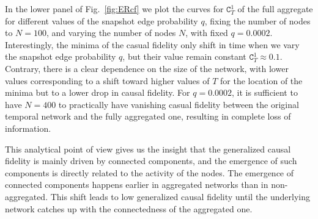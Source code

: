 \documentclass[%
 reprint,
 amsmath,amssymb,
 aps,
]{revtex4-2}
\newcommand{\fla}[1]{\textcolor{red}{flavio says: #1}}
\begin{document}
In the lower panel of Fig.~\ref{fig:ERcf} we plot the curves for $\mathtt{C}^1_T$ of the full aggregate for different values of the snapshot edge probability $q$, fixing the number of nodes to $N= 100$, and varying the number of nodes $N$, with fixed $q= 0.0002$.
Interestingly, the minima of the casual fidelity only shift in time when we vary the snapshot edge probability $q$, but their value remain constant $\mathtt{C}^1_T\approx 0.1$.
Contrary, there is a clear dependence on the size of the network, with lower values corresponding to a shift toward higher values of $T$ for the location of the minima but to a lower drop in causal fidelity. For $q= 0.0002$, it is sufficient to have $N=400$ to practically have vanishing casual fidelity between the original temporal network and the fully aggregated one, resulting in complete loss of information. 


This analytical point of view gives  us the insight that the generalized causal fidelity is mainly driven by connected components, and the emergence of such components is directly related to the activity of the nodes.
The emergence of connected components happens earlier in aggregated networks than in non-aggregated. This shift leads to low generalized causal fidelity until the underlying network catches up with the connectedness of the aggregated one. 


\end{document}
